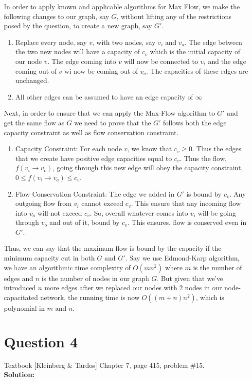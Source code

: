 \documentclass[11pt]{article}
\begin{document}
In order to apply known and applicable algorithms for Max Flow, we make the following changes to our graph, say $ G $, without lifting any of the restrictions posed by the question, to create a new graph, say $ G' $.
\begin{enumerate}
	\item Replace every node, say $ v $, with two nodes, say $ v_i $ and $ v_o $. The edge between the two new nodes will have a capacity of $ c_v $ which is the initial capacity of our node $ v $. The edge coming into $ v $ will now be connected to $ v_i $ and the edge coming out of $ v $ wi now be coming out of $ v_o $. The capacities of these edges are unchanged.
	\item All other edges can be assumed to have an edge capacity of $ \infty $
\end{enumerate}

Next, in order to ensure that we can apply the Max-Flow algorithm to $ G' $ and get the same flow as $ G $ we need to prove that the $ G' $ follows both the edge capacity constraint as well as flow conservation constraint.

\begin{enumerate}
	\item Capacity Constraint: For each node $ v $, we know that $ c_v \ge 0 $. Thus the edges that we create have positive edge capacities equal to $ c_v $. Thus the flow, $ f(v_i \to v_o) $, going through this new edge will obey the capacity constraint, $ 0 \le f(v_i \to v_o) \le c_v $.
	\item Flow Conservation Constraint: The edge we added in $ G' $ is bound by $ c_v $. Any outgoing flow from $ v_i $ cannot exceed $ c_v $. This ensure that any incoming flow into $ v_o $ will not exceed $ c_v $. So, overall whatever comes into $ v_i $ will be going through $ v_o $ and out of it, bound by $ c_v $. This ensures, flow is conserved even in $ G' $.
\end{enumerate}

Thus, we can say that the maximum flow is bound by the capacity if the minimum capacity cut in both $ G $ and $ G' $. Say we use Edmond-Karp algorithm, we have an algorithmic time complexity of $ O(mn^2) $ where $ m $ is the number of edges and $ n $ is the number of nodes in our graph $ G $. But given that we've introduced $ n $ more edges after we replaced our nodes with 2 nodes in our node-capacitated network, the running time is now $ O((m+n)n^2) $, which is polynomial in $ m $ and $ n $.

\clearpage
\section{Question 4} Textbook [Kleinberg \& Tardos] Chapter 7, page 415, problem \#15. \\
\textbf{Solution:} \\
\end{document}
